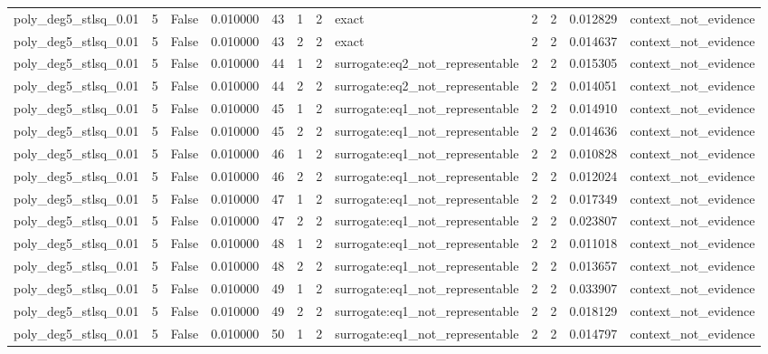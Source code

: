 \begin{tabular}{lrrrrrrlrrrl}
poly\_deg5\_stlsq\_0.01 & 5 & False & 0.010000 & 43 & 1 & 2 & exact & 2 & 2 & 0.012829 & context\_not\_evidence \\
poly\_deg5\_stlsq\_0.01 & 5 & False & 0.010000 & 43 & 2 & 2 & exact & 2 & 2 & 0.014637 & context\_not\_evidence \\
poly\_deg5\_stlsq\_0.01 & 5 & False & 0.010000 & 44 & 1 & 2 & surrogate:eq2\_not\_representable & 2 & 2 & 0.015305 & context\_not\_evidence \\
poly\_deg5\_stlsq\_0.01 & 5 & False & 0.010000 & 44 & 2 & 2 & surrogate:eq2\_not\_representable & 2 & 2 & 0.014051 & context\_not\_evidence \\
poly\_deg5\_stlsq\_0.01 & 5 & False & 0.010000 & 45 & 1 & 2 & surrogate:eq1\_not\_representable & 2 & 2 & 0.014910 & context\_not\_evidence \\
poly\_deg5\_stlsq\_0.01 & 5 & False & 0.010000 & 45 & 2 & 2 & surrogate:eq1\_not\_representable & 2 & 2 & 0.014636 & context\_not\_evidence \\
poly\_deg5\_stlsq\_0.01 & 5 & False & 0.010000 & 46 & 1 & 2 & surrogate:eq1\_not\_representable & 2 & 2 & 0.010828 & context\_not\_evidence \\
poly\_deg5\_stlsq\_0.01 & 5 & False & 0.010000 & 46 & 2 & 2 & surrogate:eq1\_not\_representable & 2 & 2 & 0.012024 & context\_not\_evidence \\
poly\_deg5\_stlsq\_0.01 & 5 & False & 0.010000 & 47 & 1 & 2 & surrogate:eq1\_not\_representable & 2 & 2 & 0.017349 & context\_not\_evidence \\
poly\_deg5\_stlsq\_0.01 & 5 & False & 0.010000 & 47 & 2 & 2 & surrogate:eq1\_not\_representable & 2 & 2 & 0.023807 & context\_not\_evidence \\
poly\_deg5\_stlsq\_0.01 & 5 & False & 0.010000 & 48 & 1 & 2 & surrogate:eq1\_not\_representable & 2 & 2 & 0.011018 & context\_not\_evidence \\
poly\_deg5\_stlsq\_0.01 & 5 & False & 0.010000 & 48 & 2 & 2 & surrogate:eq1\_not\_representable & 2 & 2 & 0.013657 & context\_not\_evidence \\
poly\_deg5\_stlsq\_0.01 & 5 & False & 0.010000 & 49 & 1 & 2 & surrogate:eq1\_not\_representable & 2 & 2 & 0.033907 & context\_not\_evidence \\
poly\_deg5\_stlsq\_0.01 & 5 & False & 0.010000 & 49 & 2 & 2 & surrogate:eq1\_not\_representable & 2 & 2 & 0.018129 & context\_not\_evidence \\
poly\_deg5\_stlsq\_0.01 & 5 & False & 0.010000 & 50 & 1 & 2 & surrogate:eq1\_not\_representable & 2 & 2 & 0.014797 & context\_not\_evidence \\

\end{tabular}
